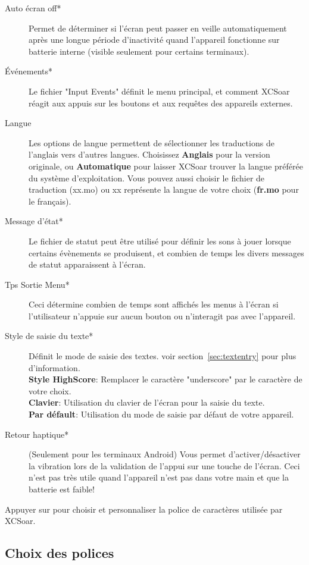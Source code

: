 \begin{description}
\item[Auto écran off*] Permet de déterminer si l'écran peut passer en veille automatiquement après une longue période d'inactivité quand l'appareil fonctionne sur batterie interne (visible seulement pour certains terminaux). 
\item[Événements*]  Le fichier "Input Events" définit le menu principal, et comment XCSoar réagit aux appuis sur les boutons et aux requêtes des appareils externes.
\item[Langue]  Les options de langue permettent de sélectionner les traductions de l'anglais vers d'autres langues. Choisissez {\bf Anglais} pour la version originale, ou {\bf Automatique} pour laisser XCSoar trouver la langue préférée du système d'exploitation. Vous pouvez aussi choisir le fichier de traduction (xx.mo) ou xx représente la langue de votre choix ({\bf fr.mo} pour le français).
\item[Message d'état*]  Le fichier de statut peut être utilisé pour définir les sons à jouer lorsque certains évènements se produisent, et combien de temps les divers messages de statut apparaissent à l'écran.
\item[Tps Sortie Menu*]  Ceci détermine combien de temps sont affichés les menus à l'écran si l'utilisateur n'appuie sur aucun bouton ou n'interagit pas avec l'appareil.
\item[Style de saisie du texte*]  Définit le mode de saisie des textes.
  voir section~\ref{sec:textentry} pour plus d'information. \\
  {\bf Style HighScore}: Remplacer le caractère "underscore" par le caractère de votre choix.\\
  {\bf Clavier}: Utilisation du clavier de l'écran pour la saisie du texte. \\
  {\bf Par défault}: Utilisation du mode de saisie par défaut de votre appareil.
\item[Retour haptique*]  (Seulement pour les terminaux Android) Vous permet d'activer/désactiver la vibration lors de la validation de l'appui sur une touche de l'écran. Ceci n'est pas très utile quand l'appareil n'est pas dans votre main et que la batterie est faible!
\end{description}

Appuyer sur  pour choisir et personnaliser la police de caractères utilisée par XCSoar.

\subsection*{Choix des polices}

